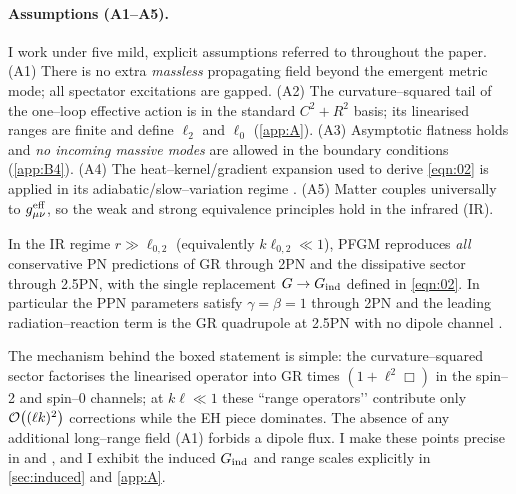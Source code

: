 \documentclass{iopjournal}
\begin{document}
\paragraph{Assumptions (A1–A5).}
I work under five mild, explicit assumptions referred to throughout the paper. (A1) There is no extra \emph{massless} propagating field beyond the emergent metric mode; all spectator excitations are gapped. (A2) The curvature–squared tail of the one–loop effective action is in the standard $C^2\!+\!R^2$ basis; its linearised ranges are finite and define $\ell_{2}$ and $\ell_{0}$ (\cref{app:A}). (A3) Asymptotic flatness holds and \emph{no incoming massive modes} are allowed in the boundary conditions (\cref{app:B4}). (A4) The heat–kernel/gradient expansion used to derive \eqref{eqn:02} is applied in its adiabatic/slow–variation regime \cite{ParkerToms,Vassilevich2003}. (A5) Matter couples universally to $g^{\rm eff}_{\mu\nu}$, so the weak and strong equivalence principles hold in the infrared (IR).

\begin{conceptbox}
	In the IR regime $r\gg \ell_{0,2}$ (equivalently $k\ell_{0,2}\ll1$), PFGM reproduces \emph{all} conservative PN predictions of GR through 2PN and the dissipative sector through 2.5PN, with the single replacement $G\to G_{\rm ind}$ defined in \eqref{eqn:02}. In particular the PPN parameters satisfy $\gamma=\beta=1$ through 2PN and the leading radiation–reaction term is the GR quadrupole at 2.5PN with no dipole channel \cite{Will2014LRR,PoissonWill2014,Blanchet2014LRR}.
	
\end{conceptbox}




The mechanism behind the boxed statement is simple: the curvature–squared sector factorises the linearised operator into GR times $(1+\ell^2\Box)$ in the spin–2 and spin–0 channels; at $k\ell\ll1$ these ``range operators’’ contribute only $\order{(\ell k)^2}$ corrections while the EH piece dominates. The absence of any additional long–range field (A1) forbids a dipole flux. I make these points precise in  and , and I exhibit the induced $G_{\rm ind}$ and range scales explicitly in \cref{sec:induced} and \cref{app:A}.
\end{document}
